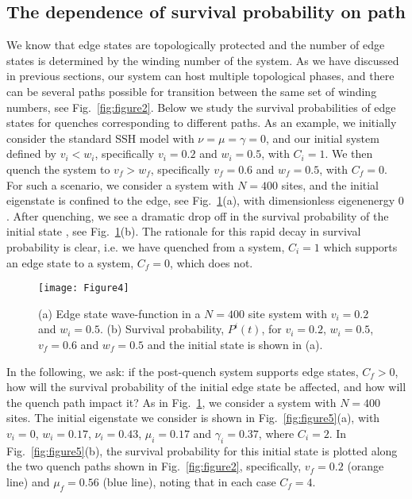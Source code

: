 \documentclass[aps,pra,reprint,superscriptaddress,longbibliography]{revtex4-2}
\begin{document}
    \subsection{The dependence of survival probability on path}
    We know that edge states are topologically protected and the number of edge states is determined by the winding number of the system.  As we have discussed in previous sections, our system can host multiple topological phases, and there can be several paths possible for transition between the same set of winding numbers, see Fig.~\ref{fig:figure2}. Below we study the survival probabilities of edge states for quenches corresponding to different paths. As an example, we initially consider the standard SSH model with $\nu=\mu=\gamma=0$, and our initial system defined by $v_i<w_i$, specifically $ v_i = 0.2 $ and $ w_i = 0.5 $, with $C_i=1$. We then quench the system to $v_f>w_f$, specifically $v_f = 0.6 $ and $w_f = 0.5 $, with $C_f=0$. For such a scenario, we consider a system with $N=400$ sites, and the initial eigenstate is confined to the edge, see Fig.~\ref{fig:figure4}(a), with dimensionless eigenenergy $0$. After quenching, we see a dramatic drop off in the survival probability of the initial state \cite{sacramento2016edge, rajak2014survival}, see Fig.~\ref{fig:figure4}(b). The rationale for this rapid decay in survival probability is clear, i.e. we have quenched from a system, $C_i=1$ which supports an edge state to a system, $C_f=0$, which does not. 
  
  \begin{figure}
  	\centering
  	\texttt{[image: Figure4]}
  	\caption{(a) Edge state wave-function in a $N=400$ site system with $ v_i= 0.2 $ and $ w_i= 0.5 $. (b) Survival probability, $P^i(t)$, for $ v_i = 0.2 $, $ w_i = 0.5 $, $ v_f = 0.6 $ and $ w_f = 0.5 $ and the initial state is shown in (a).}
  	\label{fig:figure4}
	\vspace{-0.5cm}
  \end{figure}
   
   
In the following, we ask: if the post-quench system supports edge states, $C_f>0$, how will the survival probability of the initial edge state be affected, and how will the quench path impact it? As in Fig.~\ref{fig:figure4}, we consider a system with $N=400$ sites. The initial eigenstate we consider is shown in Fig.~\ref{fig:figure5}(a), with $v_i=0$, $w_i=0.17$, $\nu_i=0.43$, $\mu_i=0.17$ and $\gamma_i=0.37$, where $C_i=2$. In Fig.~\ref{fig:figure5}(b), the survival probability for this initial state is plotted along the two quench paths shown in Fig.~\ref{fig:figure2}, specifically, $v_f=0.2$ (orange line) and $\mu_f=0.56$ (blue line), noting that in each case $ C_f = 4 $.   
      
\end{document}
